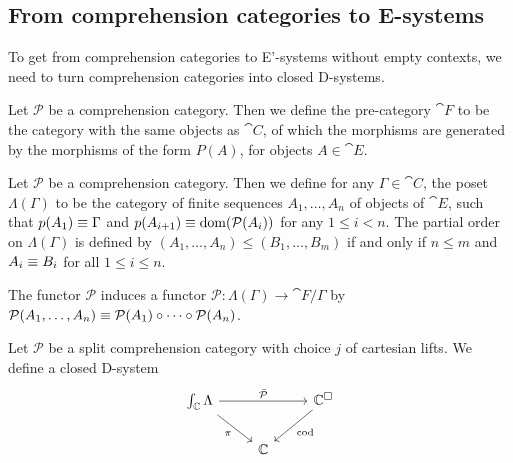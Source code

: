 \subsection{From comprehension categories to E-systems}
To get from comprehension categories to E'-systems without empty contexts, we
need to turn comprehension categories into closed D-systems. 

\begin{defn}
Let $\mathcal{P}$ be a comprehension category. Then we define the pre-category
$\cat{F}$ to be the category with the same objects as $\cat{C}$, of which the
morphisms are generated by the morphisms of the form $P(A)$, for objects
$A\in\cat{E}$. 
\end{defn}

\begin{defn}
Let $\mathcal{P}$ be a comprehension category. Then we define for any 
$\Gamma\in\cat{C}$, the poset $\Lambda(\Gamma)$ to be the category of finite 
sequences  $A_1,\ldots,A_n$ of objects of $\cat{E}$, such that 
$p(A_1)\equiv\Gamma$ and $p(A_{i+1})\equiv\mathrm{dom}(\mathcal{P}(A_i))$ 
for any $1\leq i < n$. The partial order on 
$\Lambda(\Gamma)$ is defined by $(A_1,\ldots,A_n)\leq (B_1,\ldots,B_m)$ if and 
only if $n\leq m$ and $A_i\equiv B_i$ for all $1\leq i\leq n$.

The functor $\mathcal{P}$ induces a functor $\mathcal{P}:\Lambda(\Gamma)\to
\cat{F}/\Gamma$ by $\mathcal{P}(A_1,\ldots,A_n)\equiv\mathcal{P}(A_1)\circ
\cdots\circ\mathcal{P}(A_n)$.
\end{defn}

\begin{defn}
Let $\mathcal{P}$ be a split comprehension category with choice $j$ of cartesian
lifts. We define a closed D-system
\begin{equation*}
\begin{tikzcd}
\int_{\cat{C}}\Lambda \arrow[rr,"\bar{\mathcal{P}}"] \arrow[dr,swap,"\pi"] & &
\cat{C}^\square \arrow[dl,"\mathrm{cod}"] \\ & \cat{C}
\end{tikzcd}
\end{equation*}
\end{defn}

